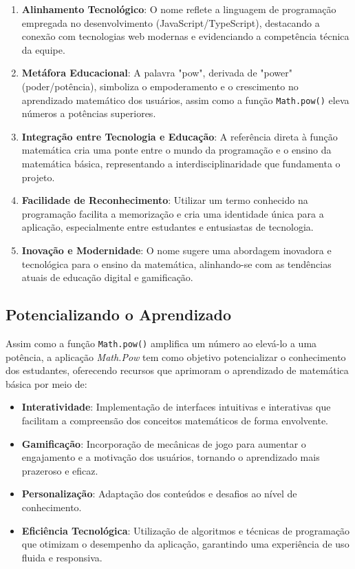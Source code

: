 \begin{enumerate}
    \item \textbf{Alinhamento Tecnológico}: O nome reflete a linguagem de programação empregada no desenvolvimento (JavaScript/TypeScript), destacando a conexão com tecnologias web modernas e evidenciando a competência técnica da equipe.

    \item \textbf{Metáfora Educacional}: A palavra "pow", derivada de "power" (poder/potência), simboliza o empoderamento e o crescimento no aprendizado matemático dos usuários, assim como a função \texttt{Math.pow()} eleva números a potências superiores.

    \item \textbf{Integração entre Tecnologia e Educação}: A referência direta à função matemática cria uma ponte entre o mundo da programação e o ensino da matemática básica, representando a interdisciplinaridade que fundamenta o projeto.

    \item \textbf{Facilidade de Reconhecimento}: Utilizar um termo conhecido na programação facilita a memorização e cria uma identidade única para a aplicação, especialmente entre estudantes e entusiastas de tecnologia.

    \item \textbf{Inovação e Modernidade}: O nome sugere uma abordagem inovadora e tecnológica para o ensino da matemática, alinhando-se com as tendências atuais de educação digital e gamificação.
\end{enumerate}

\subsection{Potencializando o Aprendizado}

Assim como a função \texttt{Math.pow()} amplifica um número ao elevá-lo a uma potência, a aplicação \textit{Math.Pow} tem como objetivo potencializar o conhecimento dos estudantes, oferecendo recursos que aprimoram o aprendizado de matemática básica por meio de:

\begin{itemize}
    \item \textbf{Interatividade}: Implementação de interfaces intuitivas e interativas que facilitam a compreensão dos conceitos matemáticos de forma envolvente.

    \item \textbf{Gamificação}: Incorporação de mecânicas de jogo para aumentar o engajamento e a motivação dos usuários, tornando o aprendizado mais prazeroso e eficaz.

    \item \textbf{Personalização}: Adaptação dos conteúdos e desafios ao nível de conhecimento.

    \item \textbf{Eficiência Tecnológica}: Utilização de algoritmos e técnicas de programação que otimizam o desempenho da aplicação, garantindo uma experiência de uso fluida e responsiva.
\end{itemize}


